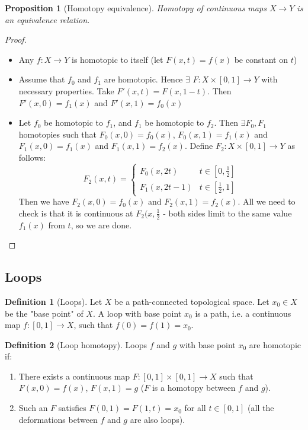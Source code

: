 \documentclass{article}
\theoremstyle{definition}
\newtheorem{defn}{Definition}[section]
\theoremstyle{plain}%
\newtheorem{prop}[thm]{Proposition}
\theoremstyle{remark}
\begin{document}
\begin{prop}[Homotopy equivalence]
    Homotopy of continuous maps $X \to Y$ is an equivalence relation.
\end{prop}

\begin{proof}
     \begin{itemize}
         \item Any $f : X \to Y$ is homotopic to itself (let $F(x,t) = f(x)$ be constant on $t$)
         \item Assume that $f_0$ and $f_1$ are homotopic. Hence $\exists$ $F : X \times [0,1] \to Y$ with necessary properties. Take $F'(x,t) = F(x, 1-t)$. Then $F'(x,0) = f_1(x)$ and $F'(x,1) = f_0(x)$
         \item Let $f_0$ be homotopic to $f_1$, and $f_1$ be homotopic to $f_2$. Then $\exists F_0, F_1$ homotopies such that $F_0(x,0) = f_0(x)$, $F_0(x, 1) = f_1(x)$ and $F_1(x,0) = f_1(x)$ and $F_1(x,1) = f_2(x)$. Define $F_2: X \times [0,1] \to Y$ as follows:
         \[F_2(x,t) = \begin{cases} F_0(x,2t) &t \in [0, \frac{1}{2}]  \\ F_1(x, 2t-1) &t \in [\frac{1}{2}, 1] \end{cases}\]
         Then we have $F_2(x,0) = f_0(x)$ and $F_2(x,1) = f_2(x)$. All we need to check is that it is continuous at $F_2(x, \frac{1}{2}$ - both sides limit to the same value $f_1(x)$ from $t$, so we are done.
     \end{itemize}
\end{proof}

\subsection{Loops}

\begin{defn}[Loops]
    Let $X$ be a path-connected topological space. Let $x_0 \in X$ be the "base point" of $X$. A loop with base point $x_0$ is a path, i.e. a continuous map $f: [0,1] \to X$, such that $f(0) = f(1) = x_0$.
\end{defn}

\begin{defn}[Loop homotopy]
    Loops $f$ and $g$ with base point $x_0$ are homotopic if:
    \begin{enumerate}
        \item There exists a continuous map $F : [0,1] \times [0,1] \to X$ such that $F(x,0) = f(x)$, $F(x,1) = g$ ($F$ is a homotopy between $f$ and $g$).
        \item Such an $F$ satisfies $F(0,1) = F(1,t) = x_0$ for all $t \in [0,1]$ (all the deformations between $f$ and $g$ are also loops).
    \end{enumerate}
\end{defn}
\end{document}
